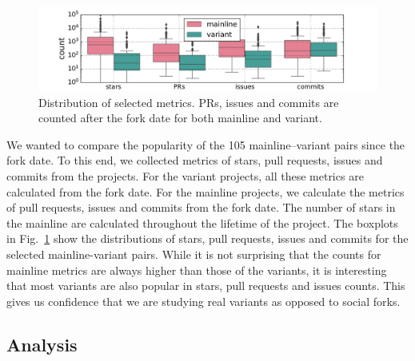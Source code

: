 \begin{figure}[ht]
\begin{center}
    \centering
    \includegraphics[width=\columnwidth]{pdfs/stats.pdf}
    \caption{Distribution of selected metrics. PRs, issues and commits are counted after the fork date for both mainline and variant.}
    \label{fig:stats}
\end{center}
\vspace{-.3cm}
\end{figure}

We wanted to compare the popularity of the 105 mainline--variant pairs since the fork date. To this end, we collected metrics of stars, pull requests, issues and commits from the projects. For the variant projects, all these metrics are calculated from the fork date. For the mainline projects, we calculate the metrics  of pull requests, issues and commits from the fork date. The number of stars in the mainline are calculated throughout the lifetime of the project.
The boxplots in Fig.~\ref{fig:stats} show the distributions of stars, pull requests, issues and commits for the selected mainline-variant pairs. %
While it is not surprising that the counts for mainline metrics are always higher than those of the variants, it is interesting that most variants are also popular in stars, pull requests and issues counts. This gives us confidence that we are studying real variants as opposed to social forks.


\subsection{Analysis}
\label{sec:card_sorting}

